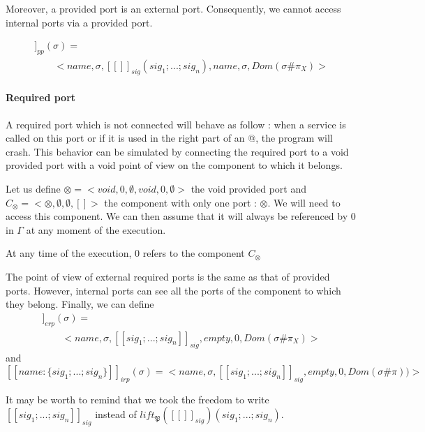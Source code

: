 Moreover, a provided port is an external port. Consequently, we cannot access internal ports via a provided port.

\begin{multline*}
[\![name:\{sig_1; ... ; sig_n\}]\!]_{pp}(\sigma) = \\
\qquad <name,\sigma,[\![]\!]_{sig}(sig_1; ... ; sig_n), name, \sigma, Dom(\sigma\#\pi_X) >
\end{multline*}


\paragraph{Required port}
A required port which is not connected will behave as follow : when a service is called on this port or if it is used in the right part of an @, the program will crash. This behavior can be simulated by connecting the required port to a void provided port with a void point of view on the component to which it belongs. 

Let us define  $\otimes = <void,0,\emptyset,void,0,\emptyset>$ the void provided port and $C_{\otimes} = <{\otimes},\emptyset,\emptyset,[]>$  the component with only one port : $\otimes$.
We will need to access this component. We can then assume that it will always be referenced by 0 in $\Gamma$ at any moment of the execution.

\begin{inv} At any time of the execution, $0$ refers to the component $C_{\otimes}$ \end{inv}

The point of view of external required ports is the same as that of provided ports. However, internal ports can see all the ports of the component to which they belong. Finally, we can define
\begin{multline*}
[\![name:\{sig_1; ... ; sig_n\}]\!]_{erp}(\sigma) =\\
\qquad <name,\sigma,[\![sig_1; ... ; sig_n]\!]_{sig}, empty, 0,Dom(\sigma\#\pi_X) >
\end{multline*}
and
\[[\![name:\{sig_1; ... ; sig_n\}]\!]_{irp}(\sigma) = <name,\sigma,[\![sig_1; ... ; sig_n]\!]_{sig}, empty, 0,Dom(\sigma\#\pi))>
\]

It may be worth to remind that we took the freedom to write $[\![sig_1; ... ; sig_n]\!]_{sig}$ instead of $lift_\mathfrak{P}([\![]\!]_{sig})(sig_1; ... ; sig_n)$.


